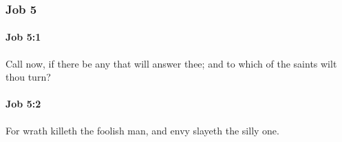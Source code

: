 	\subsubsection{Job 5} %
		\label{JOB-5}

		\paragraph{Job 5:1} %
			\label{JOB-5-1}

			Call now, if there be any that will answer thee; and to which of the saints wilt thou turn?


		\paragraph{Job 5:2} %
			\label{JOB-5-2}

			For wrath killeth the foolish man, and envy slayeth the silly one.


